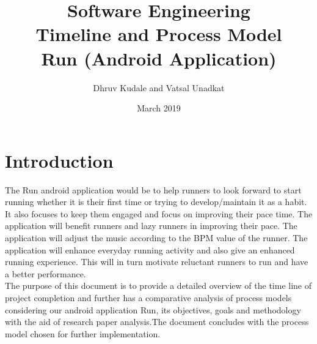 \documentclass[10pt, a4paper]{article}
\title{Software Engineering \\ Timeline and Process Model \\ Run (Android Application)}
\author{Dhruv Kudale and Vatsal Unadkat}
\date{March 2019}
\begin{document}
\maketitle

\section{Introduction}
The Run android application would be to help runners to look forward to start running whether it is their first time or trying to develop/maintain it as a habit. It also focuses to keep them engaged and focus on improving their pace time. The application will benefit runners and lazy runners in improving their pace. The application will adjust the music according to the BPM value of the runner. The application will enhance everyday running activity and also give an enhanced running experience. This will in turn motivate reluctant runners to run and have a better performance.\\ The purpose of this document is to provide a detailed overview of the time line of project completion and further has a comparative analysis of process models considering our android application Run, its objectives, goals and methodology with the aid of research paper analysis.The document concludes with the process model chosen for further implementation.
\end{document}
